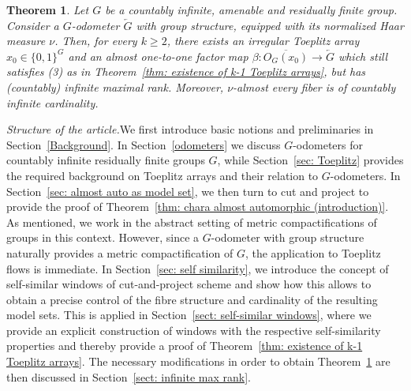 \documentclass[titlepage,reqno,10pt]{amsart}
\newtheorem{theorem}{Theorem}[section]
\theoremstyle{definition}
\newcommand{\ol}[1]{\overline{#1}}
\begin{document}
\begin{theorem} \label{thm: existence of k-1 Toeplitz arrays with infinite max rank}
    Let \( G \) be a countably infinite, amenable and residually finite group. Consider a  $G$-odometer \( \overleftarrow{G} \) with group structure, equipped with its normalized Haar measure $\nu$. Then, for every $k\geq 2$, there exists an irregular Toeplitz array $x_0\in \{0,1\}^G$ and an almost one-to-one factor map $\beta: \ol{O_G(x_0)}\to \overleftarrow{G}$ which still satisfies (3) as in Theorem~\ref{thm: existence of k-1 Toeplitz arrays}, but has (countably) infinite maximal rank. Moreover, \mbox{$\nu$-almost} every fiber is of countably infinite cardinality. 
\end{theorem}
{\textit{ Structure of the article.}}\quad We first introduce basic notions and preliminaries in Section~\ref{Background}. In Section~\ref{odometers} we discuss $G$-odometers for countably infinite residually finite groups $G$, while Section~\ref{sec: Toeplitz} provides the required background on Toeplitz arrays and their relation to $G$-odometers. In Section~\ref{sec: almost auto as model set}, we then turn to cut and project to provide the proof of Theorem~\ref{thm: chara almost automorphic (introduction)}. As mentioned, we work in the abstract setting of metric compactifications of groups in this context.
However, since a $G$-odometer with group structure naturally provides a metric compactification of $G$, the application to Toeplitz flows is immediate. In Section~\ref{sec: self similarity}, we introduce the concept of self-similar windows of cut-and-project scheme and show how this allows to obtain a precise control of the fibre structure and cardinality of the resulting model sets. This is applied in Section~\ref{sect: self-similar windows}, where we provide an explicit construction of windows with the  respective self-similarity properties and thereby provide a proof of Theorem~\ref{thm: existence of k-1 Toeplitz arrays}. The necessary modifications in order to obtain Theorem~\ref{thm: existence of k-1 Toeplitz arrays with infinite max rank} are then discussed in Section~\ref{sect: infinite max rank}.
\end{document}
